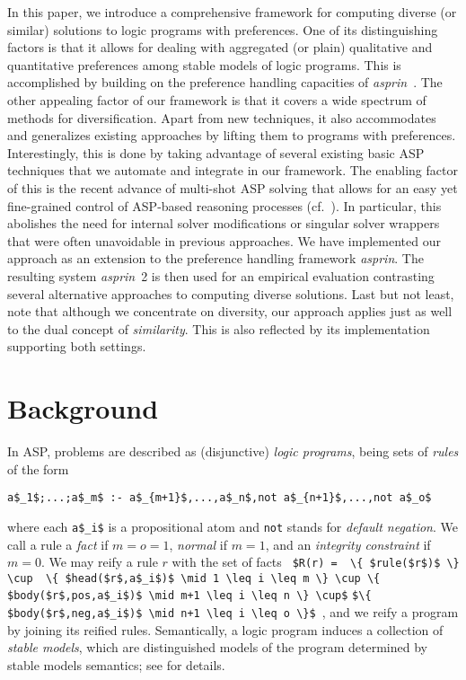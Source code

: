 \documentclass[a4paper,UKenglish]{oasics}
\newcommand{\lm}[1]{\lstinline[mathescape=true]!#1!}
\newcommand{\sysfont}{\textit}
\newcommand{\asprin}{\sysfont{asprin}}
\begin{document}
In this paper,
we introduce a comprehensive framework for computing diverse (or similar) solutions to logic programs with preferences.
One of its distinguishing factors is that it allows for dealing with aggregated (or plain) qualitative and quantitative preferences among stable models of logic programs.
This is accomplished by building on the preference handling capacities of \asprin~\cite{brderosc15a}.
The other appealing factor of our framework is that it covers a wide spectrum of methods for diversification.
Apart from new techniques, it also accommodates and generalizes existing approaches by lifting them to programs with preferences.
Interestingly, this is done by taking advantage of several existing basic ASP techniques that we automate and integrate in our framework.
The enabling factor of this is the recent advance of multi-shot ASP solving that allows for an easy yet fine-grained control of
ASP-based reasoning processes (cf.~\cite{gekakasc14b}).
In particular, this abolishes the need for internal solver modifications or singular solver wrappers that were often unavoidable in previous approaches.
We have implemented our approach as an extension to the preference handling framework \asprin.
The resulting system \asprin~2 is then used for an empirical evaluation contrasting several alternative approaches to
computing diverse solutions.
%
Last but not least,
note that although we concentrate on diversity,
our approach applies just as well to the dual concept of \emph{similarity}.
This is also reflected by its implementation supporting both settings.

%
%
%
%

%
\makeatletter{}%

\section{Background}\label{sec:background}
 
In ASP, problems are described as (disjunctive) \emph{logic programs}, 
being sets of \emph{rules} of the form
\begin{lstlisting}[mathescape=true,numbers=none]
   a$_1$;...;a$_m$ :- a$_{m+1}$,...,a$_n$,not a$_{n+1}$,...,not a$_o$
\end{lstlisting}
where each \lstinline[mathescape=true]{a$_i$} is a propositional atom %
and
\lstinline[mathescape=true]{not} stands for \emph{default negation}.
%
We call a rule a \emph{fact} if $m=o=1$, 
\emph{normal} if $m=1$, and 
an \emph{integrity constraint} if $m=0$.
%
We may reify a rule $r$ with the set of facts 
\lm{
$R(r) = 
\{ $rule($r$)$ \} \cup 
\{ $head($r$,a$_i$)$ \mid 1 \leq i \leq m \} \cup
\{ $body($r$,pos,a$_i$)$ \mid m+1 \leq i \leq n \} \cup$}
\lm{$\{ $body($r$,neg,a$_i$)$ \mid n+1 \leq i \leq o \}$
}, and we reify 
a program by joining its reified rules.
%
Semantically, a logic program induces a collection of \emph{stable models},
which are distinguished models of the program determined by stable models semantics;
see \cite{gellif91a} for details.
 
\end{document}
